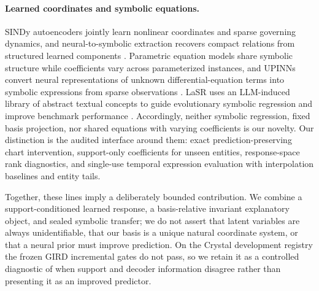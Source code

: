 \paragraph{Learned coordinates and symbolic equations.}
SINDy autoencoders jointly learn nonlinear coordinates and sparse governing
dynamics, and neural-to-symbolic extraction recovers compact relations from
structured learned components
\citep{champion2019data,cranmer2020discovering}.  Parametric equation models
share symbolic structure while coefficients vary across parameterized
instances, and UPINNs
convert neural representations of unknown differential-equation terms into
symbolic expressions from sparse observations
\citep{zhang2022parametric,podina2023universal}.  LaSR uses an LLM-induced
library of abstract textual concepts to guide evolutionary symbolic regression
and improve benchmark performance \citep{grayeli2024lasr}.  Accordingly, neither
symbolic regression, fixed basis projection, nor shared equations with varying
coefficients is our novelty.  Our distinction is the audited interface around
them: exact prediction-preserving chart intervention, support-only coefficients
for unseen entities, response-space rank diagnostics, and single-use temporal
expression evaluation with interpolation baselines and entity tails.

Together, these lines imply a deliberately bounded contribution.  We combine a
support-conditioned learned response, a basis-relative invariant explanatory
object, and sealed symbolic transfer; we do not assert that latent variables are
always unidentifiable, that our basis is a unique natural coordinate system, or
that a neural prior must improve prediction.  On the Crystal development
registry the frozen GIRD incremental gates do not pass, so we retain it as a
controlled diagnostic of when support and decoder information disagree rather
than presenting it as an improved predictor.
